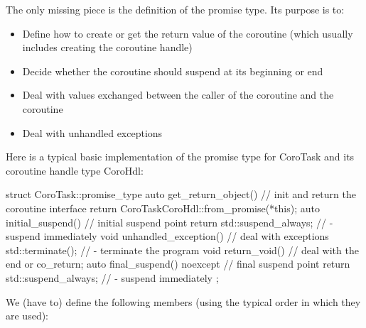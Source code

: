 
The only missing piece is the definition of the promise type. Its purpose is to:

\begin{itemize}
\item 
Define how to create or get the return value of the coroutine (which usually includes creating the coroutine handle)

\item 
Decide whether the coroutine should suspend at its beginning or end

\item 
Deal with values exchanged between the caller of the coroutine and the coroutine

\item 
Deal with unhandled exceptions
\end{itemize}

Here is a typical basic implementation of the promise type for CoroTask and its coroutine handle type CoroHdl:


\begin{cpp}
struct CoroTask::promise_type {
	auto get_return_object() { // init and return the coroutine interface
		return CoroTask{CoroHdl::from_promise(*this)};
	}
	auto initial_suspend() { // initial suspend point
		return std::suspend_always{}; // - suspend immediately
	}
	void unhandled_exception() { // deal with exceptions
		std::terminate(); // - terminate the program
	}
	void return_void() { // deal with the end or co_return;
	}
	auto final_suspend() noexcept { // final suspend point
		return std::suspend_always{}; // - suspend immediately
	}
};
\end{cpp}
	
We (have to) define the following members (using the typical order in which they are used):

